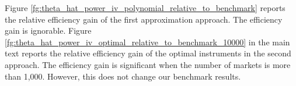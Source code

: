 \documentclass[11pt, a4paper]{article}
\begin{document}


Figure \ref{fg:theta_hat_power_iv_polynomial_relative_to_benchmark} reports the relative efficiency gain of the first approximation approach. 
The efficiency gain is ignorable.
Figure \ref{fg:theta_hat_power_iv_optimal_relative_to_benchmark_10000} in the main text reports the relative efficiency gain of the optimal instruments in the second approach. 
The efficiency gain is significant when the number of markets is more than 1,000. 
However, this does not change our benchmark results.
\end{document}
